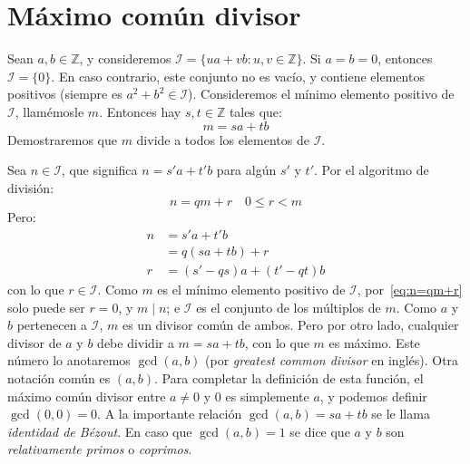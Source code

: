 \section{Máximo común divisor}
\label{sec:GCD}

  Sean \(a, b \in \mathbb{Z}\),
  y consideremos
  \(\mathcal{I} = \{u a + v b \colon u, v \in \mathbb{Z}\}\).%
  Si \(a = b = 0\),
  entonces \(\mathcal{I} = \{0\}\).
  En caso contrario,
  este conjunto no es vacío,
  y contiene elementos positivos
  (siempre es \(a^2 + b^2 \in \mathcal{I}\)).
  Consideremos el mínimo elemento positivo de \(\mathcal{I}\),
  llamémosle \(m\).
  Entonces hay \(s, t \in \mathbb{Z}\)
  tales que:
  \begin{equation}
    \label{eq:base-Bezout}
    m = s a + t b
  \end{equation}
  Demostraremos que \(m\) divide a todos los elementos de \(\mathcal{I}\).

  Sea \(n \in \mathcal{I}\),
  que significa \(n = s' a + t' b\) para algún \(s'\) y \(t'\).
  Por el algoritmo de división:%
  \begin{equation}
    \label{eq:n=qm+r}
    n = q m + r \quad 0 \le r < m
  \end{equation}
  Pero:
  \begin{align*}
    n
      &= s' a + t' b \\
      &= q (s a + t b) + r	 \\
    r
      &= (s' - q s) a + (t' - q t) b
  \end{align*}
  con lo que \(r \in \mathcal{I}\).
  Como \(m\) es el mínimo elemento positivo de \(\mathcal{I}\),
  por~\eqref{eq:n=qm+r}
  solo puede ser \(r = 0\),
  y \(m \mid n\);
  e \(\mathcal{I}\) es el conjunto de los múltiplos de \(m\).
  Como \(a\) y \(b\) pertenecen a \(\mathcal{I}\),
  \(m\) es un divisor común de ambos.
  Pero por otro lado,
  cualquier divisor de \(a\) y \(b\) debe dividir a \(m = s a + t b\),
  con lo que \(m\) es máximo.
  Este número lo anotaremos \(\gcd(a, b)\)
  (por \emph{\foreignlanguage{english}{greatest common divisor}} en inglés).
  Otra notación común es \((a, b)\).
  Para completar la definición de esta función,
  el máximo común divisor entre \(a \ne 0\) y \(0\) es simplemente \(a\),
  y podemos definir \(\gcd(0, 0) = 0\).
  A la importante relación \(\gcd(a, b) = s a + t b\)
  se le llama \emph{identidad de Bézout}.
  En caso que \(\gcd(a, b) = 1\) se dice que \(a\) y \(b\)
  son \emph{relativamente primos}%
  o \emph{coprimos}.%

